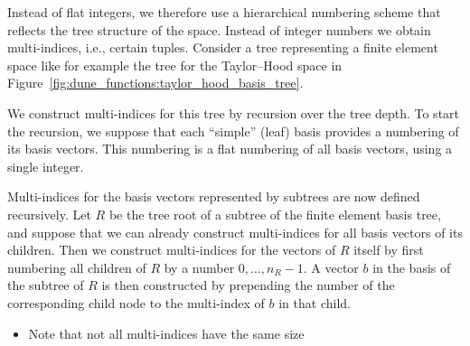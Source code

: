 \documentclass[a4paper,10pt,headings=normal,bibliography=totoc]{scrartcl}
\begin{document}
Instead of flat integers, we therefore use a hierarchical numbering scheme that reflects the tree structure
of the space.  Instead of integer numbers we obtain multi-indices, i.e., certain tuples.
Consider a tree representing a finite element space like for example the tree for the Taylor--Hood space in
Figure~\ref{fig:dune_functions:taylor_hood_basis_tree}.

We construct multi-indices for this tree by recursion over the tree depth.  To start the recursion,
we suppose that each ``simple'' (leaf) basis provides a numbering of its basis vectors.  This numbering is
a flat numbering of all basis vectors, using a single integer.

Multi-indices for the basis vectors represented by subtrees are now defined recursively.  Let $R$ be the tree root
of a subtree of the finite element basis tree, and suppose that we can already construct multi-indices
for all basis vectors of its children.  Then we construct multi-indices for the vectors of $R$ itself
by first numbering all children of $R$ by a number $0,\dots,n_R-1$.  A vector $b$ in the basis of the
subtree of $R$ is then constructed by prepending the number of the corresponding child node to the
multi-index of $b$ in that child.


\begin{itemize}
 \item Note that not all multi-indices have the same size
\end{itemize}
\end{document}
